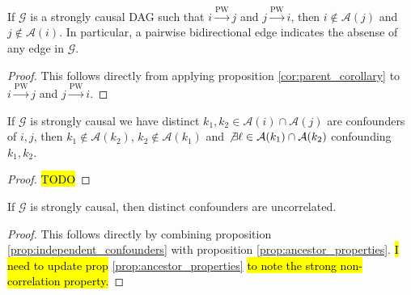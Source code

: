 \documentclass[12pt]{article}
\def\pwgc{\overset{\text{PW}}{\rightarrow}}  %
\def\gcg{\mathcal{G}}  %
\newcommand{\pa}[1]{pa(#1)}  %
\newcommand{\anc}[1]{\mathcal{A}(#1)}  %
\begin{document}
\begin{corollary}
  \label{cor:bidirectional_edge}
  If $\gcg$ is a strongly causal DAG such that $i \pwgc j$ and
  $j \pwgc i$, then $i \not\in \anc{j}$ and $j \not\in \anc{i}$.  In
  particular, a pairwise bidirectional edge indicates the absense of
  any edge in $\gcg$.
\end{corollary}
\begin{proof}
  This follows directly from applying proposition
  \ref{cor:parent_corollary} to $i \pwgc j$ and $j \pwgc i$.
\end{proof}

\begin{proposition}
  \label{prop:independent_confounders}
  If $\gcg$ is strongly causal we have distinct
  $k_1, k_2 \in \anc{i} \cap \anc{j}$ are confounders of $i, j$, then
  $k_1 \not\in \anc{k_2}$, $k_2 \not\in \anc{k_1}$ and
  $\not\exists \ell \in \anc{k_1} \cap \anc{k_2}$ confounding
  $k_1, k_2$.
\end{proposition}
\begin{proof}
  \hl{TODO}
\end{proof}

\begin{corollary}
  If $\gcg$ is strongly causal, then distinct confounders are
  uncorrelated.
\end{corollary}
\begin{proof}
  This follows directly by combining proposition
  \ref{prop:independent_confounders} with proposition \ref{prop:ancestor_properties}.  \hl{I need to update prop} \ref{prop:ancestor_properties} \hl{to note the strong non-correlation property.}
\end{proof}
\end{document}
